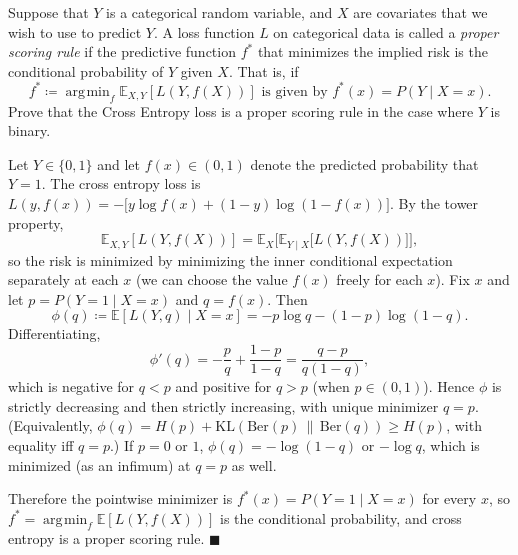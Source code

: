 \documentclass{article}
\DeclareMathOperator*{\argmin}{\arg\!\min}
\newcommand{\qed}{$\blacksquare \quad$}     %
\newcounter{exercise}
\begin{document}
\begin{exercise}
  Suppose that $Y$ is a categorical random variable, and $X$ are covariates that we wish to use to predict $Y$. A loss function $L$ on categorical data is called a \textit{proper scoring rule} if the predictive function $f^*$ that minimizes the implied risk is the conditional probability of $Y$ given $X$. That is, if
  \[
    f^* \coloneqq \argmin_f \mathbb{E}_{X,Y}\left[L\left(Y, f(X)\right)\right] \text{ is given by } f^*(x) = P(Y \mid X = x).
  \]
  Prove that the Cross Entropy loss is a proper scoring rule in the case where $Y$ is binary.
\end{exercise}
\begin{solution}
  Let $Y \in \{0,1\}$ and let $f(x) \in (0,1)$ denote the predicted probability that $Y = 1$. The cross entropy loss is $L(y, f(x)) = -\big[y \log f(x) + (1-y)\log(1 - f(x))\big]$. By the tower property,
  \[
    \mathbb{E}_{X,Y}[L(Y, f(X))] = \mathbb{E}_X\Big[\mathbb{E}_{Y \mid X}\big[L(Y, f(X))\big]\Big],
  \]
  so the risk is minimized by minimizing the inner conditional expectation separately at each $x$ (we can choose the value $f(x)$ freely for each $x$). Fix $x$ and let $p = P(Y = 1 \mid X = x)$ and $q = f(x)$. Then
  \[
    \phi(q) \coloneqq \mathbb{E}[L(Y,q) \mid X = x] = -p\log q - (1-p)\log(1-q).
  \]
  Differentiating,
  \[
    \phi'(q) = -\frac{p}{q} + \frac{1-p}{1-q} = \frac{q - p}{q(1-q)},
  \]
  which is negative for $q < p$ and positive for $q > p$ (when $p \in (0,1)$). Hence $\phi$ is strictly decreasing and then strictly increasing, with unique minimizer $q = p$. (Equivalently, $\phi(q) = H(p) + \mathrm{KL}(\mathrm{Ber}(p)\,\|\,\mathrm{Ber}(q)) \ge H(p)$, with equality iff $q = p$.) If $p = 0$ or $1$, $\phi(q) = -\log(1-q)$ or $-\log q$, which is minimized (as an infimum) at $q = p$ as well.

  Therefore the pointwise minimizer is $f^*(x) = P(Y = 1 \mid X = x)$ for every $x$, so $f^* = \argmin_f \mathbb{E}[L(Y, f(X))]$ is the conditional probability, and cross entropy is a proper scoring rule. \qed
\end{solution}
\end{document}
